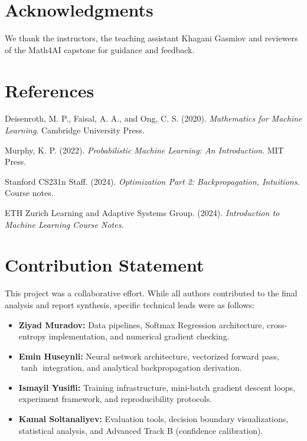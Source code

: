 \documentclass[sigconf,screen,nonacm]{acmart}
\begin{document}
\section*{Acknowledgments}
We thank the instructors, the teaching assistant Khagani Gasmiov and reviewers of the Math4AI capstone for guidance and feedback.

\section*{References}
\begin{enumerate}[label={[\arabic*]}, leftmargin=2em, itemsep=0.5em]
    \item Deisenroth, M. P., Faisal, A. A., and Ong, C. S. (2020). \textit{Mathematics for Machine Learning}. Cambridge University Press.
    
    \item Murphy, K. P. (2022). \textit{Probabilistic Machine Learning: An Introduction}. MIT Press.
    
    \item Stanford CS231n Staff. (2024). \textit{Optimization Part 2: Backpropagation, Intuitions}. Course notes.
    
    \item ETH Zurich Learning and Adaptive Systems Group. (2024). \textit{Introduction to Machine Learning Course Notes}.
    
\end{enumerate}

\section*{Contribution Statement}
This project was a collaborative effort. While all authors contributed to the final analysis and report synthesis, specific technical leads were as follows:

\begin{itemize}[leftmargin=*]
  \item \textbf{Ziyad Muradov:} Data pipelines, Softmax Regression architecture, cross-entropy implementation, and numerical gradient checking.
  \item \textbf{Emin Huseynli:} Neural network architecture, vectorized forward pass, $\tanh$ integration, and analytical backpropagation derivation.
  \item \textbf{Ismayil Yusifli:} Training infrastructure, mini-batch gradient descent loops, experiment framework, and reproducibility protocols.
  \item \textbf{Kamal Soltanaliyev:} Evaluation tools, decision boundary visualizations, statistical analysis, and Advanced Track B (confidence calibration).
\end{itemize}
\end{document}
